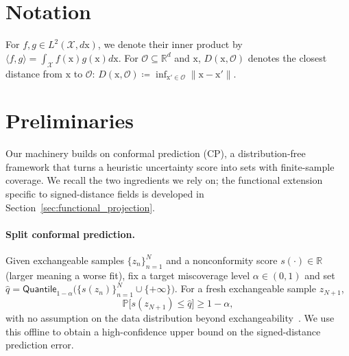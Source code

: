 \documentclass[lettersize,journal]{IEEEtran}
\begin{document}
    


\section{Notation}
For $f, g \in L^2(\mathcal{X}, d\mathrm{x})$, we denote their inner product by $\langle f, g \rangle = \int_{\mathcal{X}} f(\mathrm{x})g(\mathrm{x}) d\mathrm{x}$. For $\mathcal{O} \subseteq \mathbb{R}^d$ and $\mathrm{x}$, $D(\mathrm{x}, \mathcal{O})$ denotes the closest distance from $\mathrm{x}$ to $\mathcal{O}$: $D(\mathrm{x}, \mathcal{O})\coloneqq \inf_{\mathrm{x}'\in \mathcal{O}} \| \mathrm{x} - \mathrm{x'}\|$.



\section{Preliminaries}
\label{sec:preliminaries}

Our machinery builds on conformal prediction (CP), a distribution-free
framework that turns a heuristic uncertainty score into sets with finite-sample
coverage. We recall the two ingredients we rely on; the functional extension
specific to signed-distance fields is developed in
Section~\ref{sec:functional_projection}.

\paragraph{Split conformal prediction.}
Given exchangeable samples $\{z_n\}_{n=1}^N$ and a nonconformity score
$s(\cdot)\in\mathbb{R}$ (larger meaning a worse fit), fix a target miscoverage
level $\alpha\in(0,1)$ and set
$\hat q = \mathsf{Quantile}_{1-\alpha}\bigl(\{s(z_n)\}_{n=1}^N\cup\{+\infty\}\bigr)$.
For a fresh exchangeable sample $z_{N+1}$,
\begin{equation}
\mathbb{P}\bigl[s(z_{N+1})\le \hat q\bigr]\ge 1-\alpha,
\label{eq:split_cp}
\end{equation}
with no assumption on the data distribution beyond exchangeability~\cite{lei2015conformal}.
We use this offline to obtain a high-confidence upper bound on the
signed-distance prediction error.
\end{document}
